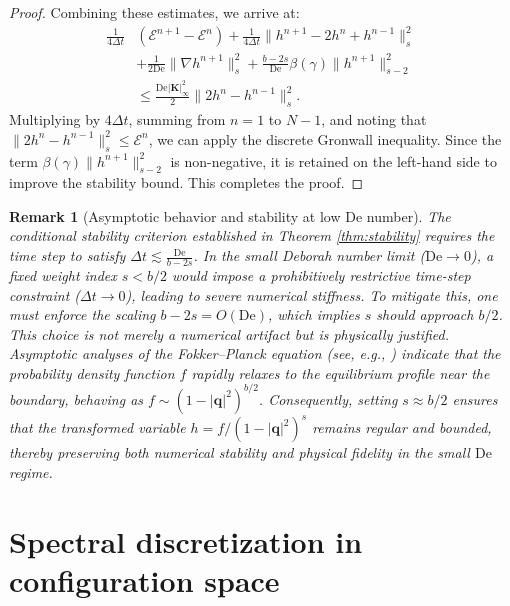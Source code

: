 \documentclass[preprint,12pt]{elsarticle}
\newtheorem{remark}{Remark}[section]
\begin{document}
\begin{proof}
Combining these estimates, we arrive at:
\begin{equation}
\begin{aligned}
    \frac{1}{4\Delta t} &(\mathcal{E}^{n+1} - \mathcal{E}^n) + \frac{1}{4\Delta t}\|h^{n+1}-2h^n+h^{n-1}\|_s^2 \\
    &+ \frac{1}{2\text{De}}\|\nabla h^{n+1}\|_s^2 +  \frac{b-2s}{\text{De}}\beta(\gamma)\|h^{n+1}\|_{s-2}^2 \\
    &\le \frac{\text{De}|\boldsymbol{K}|_\infty^2}{2} \|2h^n - h^{n-1}\|_s^2.
\end{aligned}
\end{equation}
Multiplying by $4\Delta t$, summing from $n=1$ to $N-1$, and noting that $\|2h^n - h^{n-1}\|_s^2 \le \mathcal{E}^n$, we can apply the discrete Gronwall inequality. Since the term $\beta(\gamma)\|h^{n+1}\|_{s-2}^2$ is non-negative, it is retained on the left-hand side to improve the stability bound. This completes the proof.
\end{proof}

\begin{remark}[Asymptotic behavior and stability at low $\mathrm{De}$ number]
The conditional stability criterion established in Theorem \ref{thm:stability} requires the time step to satisfy $\Delta t \lesssim \frac{\mathrm{De}}{b-2s}$. In the small Deborah number limit ($\mathrm{De} \to 0$), a fixed weight index $s < b/2$ would impose a prohibitively restrictive time-step constraint ($\Delta t \to 0$), leading to severe numerical stiffness. To mitigate this, one must enforce the scaling $b-2s = O(\mathrm{De})$, which implies $s$ should approach $b/2$. 
This choice is not merely a numerical artifact but is physically justified. Asymptotic analyses of the Fokker--Planck equation (see, e.g., \cite{Jourdain04,Zhang06}) indicate that the probability density function $f$ rapidly relaxes to the equilibrium profile near the boundary, behaving as $f \sim (1-|\bm{q}|^2)^{b/2}$. Consequently, setting $s \approx b/2$ ensures that the transformed variable $h = f/(1-|\bm{q}|^2)^s$ remains regular and bounded, thereby preserving both numerical stability and physical fidelity in the small $\mathrm{De}$ regime.
\end{remark}

\section{Spectral discretization in configuration space}
\end{document}
